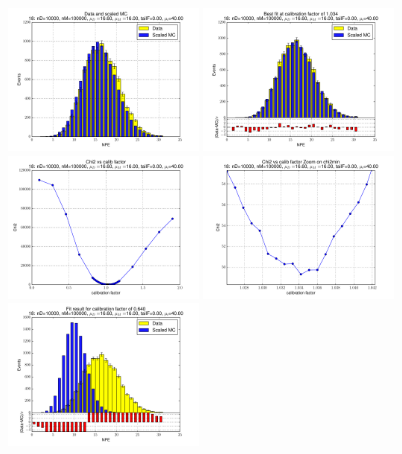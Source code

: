 
 \begin{figure}[htbp] \begin{center} 
\includegraphics[width=0.45\textwidth]{../FIGURES/18/FIG_Data_and_scaled_MC.pdf} 
\includegraphics[width=0.45\textwidth]{../FIGURES/18/FIG_Best_fit_at_calibration_factor_of_1_034.pdf} 
\includegraphics[width=0.45\textwidth]{../FIGURES/18/FIG_Chi2_vs_calib_factor.pdf} 
\includegraphics[width=0.45\textwidth]{../FIGURES/18/FIG_Chi2_vs_calib_factor_Zoom_on_chi2min.pdf} 
\includegraphics[width=0.45\textwidth]{../FIGURES/18/FIG_Fit_result_for_calibration_factor_of_0_640.pdf} 

\end{center}
\end{figure}
